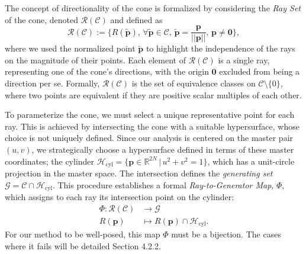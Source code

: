 \documentclass[a4paper,9pt,parskip=half,english]{article}
\theoremstyle{plain}
\theoremstyle{definition}
\newcommand{\vp}{\mathbf p}
\begin{document}
The concept of directionality of the cone is formalized by considering the \textit{Ray Set} of the cone, denoted $\mathcal{R}(\mathcal{C})$ and defined as
\begin{equation}
	\mathcal{R}(\mathcal{C}) := \{  R(\tilde{\vp}), \, \forall \tilde{\vp} \in \mathcal{C}, \, \tilde{\vp} = \frac{\vp}{||\vp||}, \, \vp \neq \bm{0} \},
\end{equation}
where we used the normalized point $\tilde{\vp}$ to highlight the independence of the rays on the magnitude of their points. 
Each element of $\mathcal{R}(\mathcal{C})$ is a single ray, representing one of the cone's directions, with the origin $\bm{0}$ excluded from being a direction per se. Formally, $\mathcal{R}(\mathcal{C})$ is the set of equivalence classes on $\mathcal{C} \setminus \{0\}$, where two points are equivalent if they are positive scalar multiples of each other.

To parameterize the cone, we must select a unique representative point for each ray. This is achieved by intersecting the cone with a suitable hypersurface, whose choice is not uniquely defined. Since our analysis is centered on the master pair $(u,v)$, we strategically choose a hypersurface defined in terms of these master coordinates; the cylinder $\mathcal{H}_{\textrm{cyl}} = \{ \vp \in \mathbb{R}^{2N} \, | \, u^2+v^2 = 1 \}$, which has a unit-circle projection in the master space. The intersection defines the \textit{generating set} $\mathcal{G} = \mathcal{C} \cap \mathcal{H}_{\text{cyl}}$. This procedure establishes a formal \textit{Ray-to-Generator Map}, $\Phi$, which assigns to each ray its intersection point on the cylinder:
\begin{equation}
	\begin{aligned}
		\Phi: \mathcal{R}(\mathcal{C}) &\to \mathcal{G} \\
		R(\vp) &\mapsto R(\vp) \cap \mathcal{H}_{\text{cyl}}.
	\end{aligned}
\end{equation}
For our method to be well-posed, this map $\Phi$ must be a bijection. The cases where it fails will be detailed Section 4.2.2.
\end{document}
